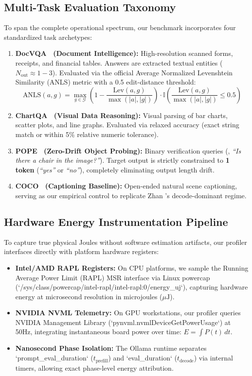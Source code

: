 \subsection{Multi-Task Evaluation Taxonomy}
To span the complete operational spectrum, our benchmark incorporates four standardized task archetypes:
\begin{enumerate}[leftmargin=*]
    \item \textbf{DocVQA~\cite{mathew2021docvqa} (Document Intelligence):} High-resolution scanned forms, receipts, and financial tables. Answers are extracted textual entities ($N_{\text{out}} \approx 1-3$). Evaluated via the official Average Normalized Levenshtein Similarity (ANLS) metric with a 0.5 edit-distance threshold:
    \begin{equation}
        \text{ANLS}(a, g) = \max_{g \in \mathcal{G}} \left(1 - \frac{\text{Lev}(a, g)}{\max(|a|, |g|)}\right) \cdot \mathbb{I}\left(\frac{\text{Lev}(a, g)}{\max(|a|, |g|)} \le 0.5\right)
    \end{equation}
    \item \textbf{ChartQA~\cite{masry2022chartqa} (Visual Data Reasoning):} Visual parsing of bar charts, scatter plots, and line graphs. Evaluated via relaxed accuracy (exact string match or within 5\% relative numeric tolerance).
    \item \textbf{POPE~\cite{li2023evaluating} (Zero-Drift Object Probing):} Binary verification queries (\eg, \emph{``Is there a chair in the image?''}). Target output is strictly constrained to \textbf{1 token} (\emph{``yes''} or \emph{``no''}), completely eliminating output length drift.
    \item \textbf{COCO~\cite{lin2014microsoft} (Captioning Baseline):} Open-ended natural scene captioning, serving as our empirical control to replicate Zhan \etal's decode-dominant regime.
\end{enumerate}

\subsection{Hardware Energy Instrumentation Pipeline}
To capture true physical Joules without software estimation artifacts, our profiler interfaces directly with platform hardware registers:
\begin{itemize}[leftmargin=*]
    \item \textbf{Intel/AMD RAPL Registers:} On CPU platforms, we sample the Running Average Power Limit (RAPL) MSR interface via Linux powercap (`/sys/class/powercap/intel-rapl/intel-rapl:0/energy_uj`), capturing hardware energy at microsecond resolution in microjoules ($\mu\text{J}$).
    \item \textbf{NVIDIA NVML Telemetry:} On GPU workstations, our profiler queries NVIDIA Management Library (`pynvml.nvmlDeviceGetPowerUsage`) at 50Hz, integrating instantaneous board power over time: $E = \int P(t) \, dt$.
    \item \textbf{Nanosecond Phase Isolation:} The Ollama runtime separates `prompt_eval_duration` ($t_{\text{prefill}}$) and `eval_duration` ($t_{\text{decode}}$) via internal timers, allowing exact phase-level energy attribution.
\end{itemize}
